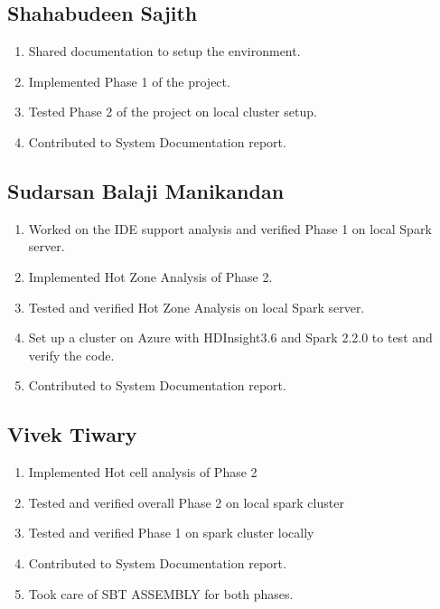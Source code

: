 \subsection{Shahabudeen Sajith}
\begin{enumerate}
    \item Shared documentation to setup the environment.
    \item Implemented Phase 1 of the project.
    \item Tested Phase 2 of the project on local cluster setup.
    \item Contributed to System Documentation report.
\end{enumerate}

\subsection{Sudarsan Balaji Manikandan}
\begin{enumerate}
    \item Worked on the IDE support analysis and verified Phase 1 on local Spark server.
    \item Implemented Hot Zone Analysis of Phase 2.
    \item Tested and verified Hot Zone Analysis on local Spark server.
    \item Set up a cluster on Azure with HDInsight3.6 and Spark 2.2.0 to test and verify the code.
    \item Contributed to System Documentation report.
\end{enumerate}

\subsection{Vivek Tiwary}
\begin{enumerate}
    \item Implemented Hot cell analysis of Phase 2
    \item Tested and verified overall Phase 2 on local spark cluster
    \item Tested and verified Phase 1 on spark cluster locally
    \item Contributed to System Documentation report.
    \item Took care of SBT ASSEMBLY for both phases.
\end{enumerate}



\newpage



